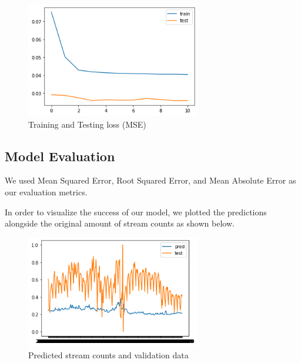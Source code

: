 \documentclass[11pt]{article}
\begin{document}
\begin{figure}
    \centering 
    \includegraphics[width=3in]{figs/loss.png}
    \caption{Training and Testing loss (MSE)}
\end{figure}

\subsection{Model Evaluation}
We used Mean Squared Error, Root Squared Error, and Mean Absolute Error as our evaluation metrics. 

In order to visualize the success of our model, we plotted the predictions alongside the original amount of stream counts as shown below.

\begin{figure}
    \centering
    \includegraphics[width=3in ]{figs/stream_count_PLACEHOLDER}
    \caption{Predicted stream counts and validation data }
\end{figure}

\end{document}
